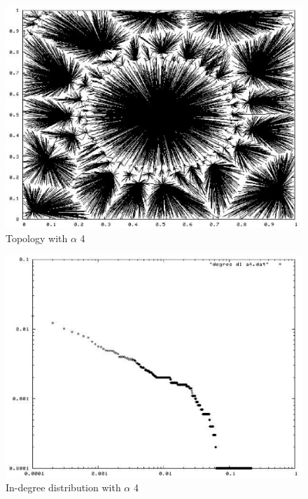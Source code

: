 \documentclass[a4paper,12pt]{article}
\begin{document}
\begin{figure}
\begin{center}
\includegraphics[scale=0.6]{pic_alfa4.eps}
\end{center}
\caption{Topology with $\alpha$ 4\label{t4figure}}
\end{figure}

\begin{figure}
\begin{center}
\includegraphics[scale=0.6]{picdegree_alfa4.eps}
\end{center}
\caption{In-degree distribution with $\alpha$ 4 \label{d4figure}}
\end{figure}
\end{document}
